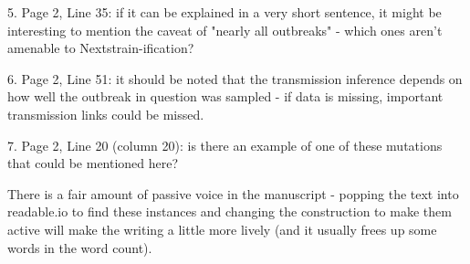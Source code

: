\documentclass[12pt,a4paper]{article}
\begin{document}
5. Page 2, Line 35: if it can be explained in a very short sentence, it might be interesting to mention the caveat of "nearly all outbreaks" - which ones aren't amenable to Nextstrain-ification?

6. Page 2, Line 51: it should be noted that the transmission inference depends on how well the outbreak in question was sampled - if data is missing, important transmission links could be missed.

7. Page 2, Line 20 (column 20): is there an example of one of these mutations that could be mentioned here?

There is a fair amount of passive voice in the manuscript - popping the text into readable.io to find these instances and changing the construction to make them active will make the writing a little more lively (and it usually frees up some words in the word count).
\end{document}
